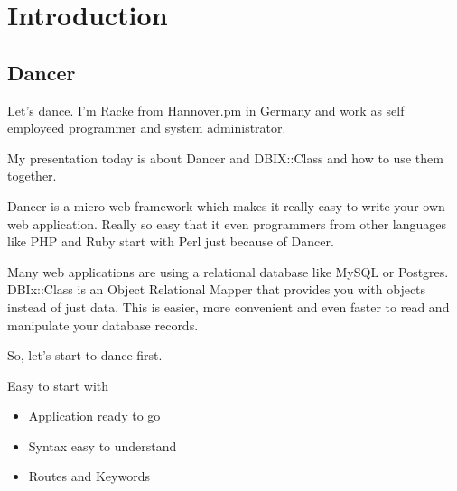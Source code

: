 
\section{Introduction}


\subsection{Dancer}

Let's dance. I'm Racke from Hannover.pm in Germany and work
as self employeed programmer and system administrator.

My presentation today is about Dancer and DBIX::Class and how to use
them together.

Dancer is a micro web framework which makes it really easy
to write your own web application. Really so easy that it even
programmers from other languages like PHP and Ruby start with Perl
just because of Dancer.

Many web applications are using a relational database like MySQL
or Postgres. DBIx::Class is an Object Relational Mapper that provides
you with objects instead of just data. This is easier, more convenient 
and even faster to read and manipulate your database records.

So, let's start to dance first.
 
\begin{frame}{Easy to start with}
\begin{itemize}
\item Application ready to go
\item Syntax easy to understand
\item Routes and Keywords
\end{itemize}
\end{frame}

